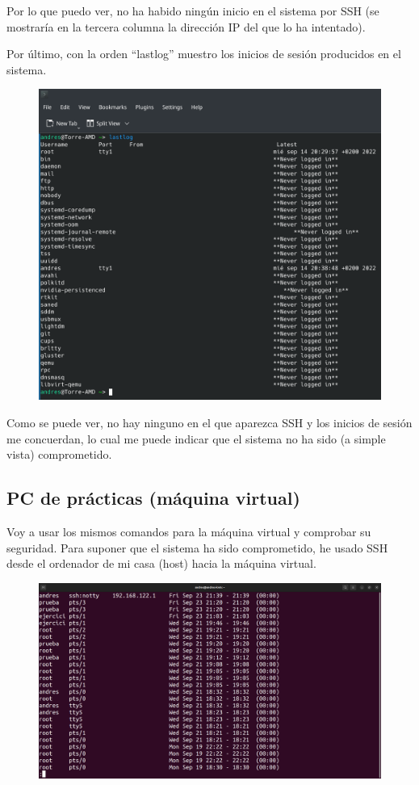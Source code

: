 \documentclass{article}
\begin{document}
Por lo que puedo ver, no ha habido ningún inicio en el sistema por SSH (se mostraría en la tercera columna la dirección IP del que lo ha intentado).

Por último, con la orden ``lastlog'' muestro los inicios de sesión producidos en el sistema.

\begin{figure}[H]
    \includegraphics[width=\textwidth]{imagenes/lastlogcasa.png}
\end{figure}

Como se puede ver, no hay ninguno en el que aparezca SSH y los inicios de sesión me concuerdan, lo cual me puede indicar que el sistema no ha sido (a simple vista) comprometido.

\subsection*{PC de prácticas (máquina virtual)}
Voy a usar los mismos comandos para la máquina virtual y comprobar su seguridad. Para suponer que el sistema ha sido comprometido, he usado SSH desde el ordenador de mi casa (host) hacia la máquina virtual.

\begin{figure}[H]
    \includegraphics[width=\textwidth]{imagenes/lastbip.png}
\end{figure}
\end{document}
